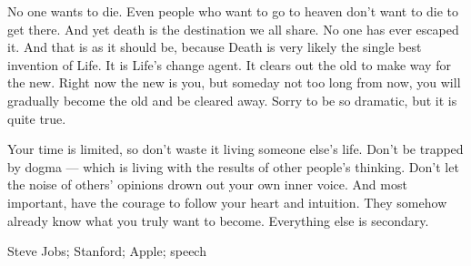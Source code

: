 
\begin{abstract-en}

No one wants to die. Even people who want to go to heaven don't want to die to get there. And yet death is the destination we all share. No one has ever escaped it. And that is as it should be, because Death is very likely the single best invention of Life. It is Life's change agent. It clears out the old to make way for the new. Right now the new is you, but someday not too long from now, you will gradually become the old and be cleared away. Sorry to be so dramatic, but it is quite true.

Your time is limited, so don't waste it living someone else's life. Don't be trapped by dogma — which is living with the results of other people's thinking. Don't let the noise of others' opinions drown out your own inner voice. And most important, have the courage to follow your heart and intuition. They somehow already know what you truly want to become. Everything else is secondary.

\end{abstract-en}

\begin{keywords-en}
Steve Jobs; Stanford; Apple; speech
\end{keywords-en}
